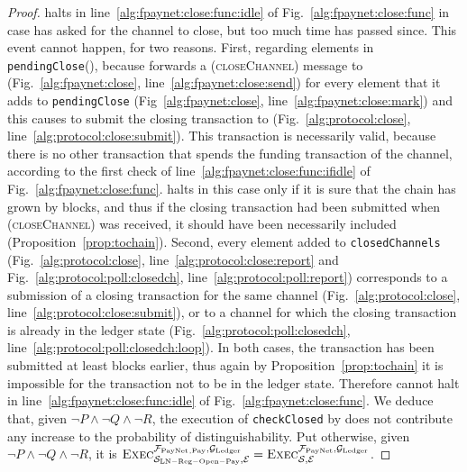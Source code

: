 \begin{proof}
  \fpaynet{} halts in line~\ref{alg:fpaynet:close:func:idle} of
  Fig.~\ref{alg:fpaynet:close:func} in case \environment{} has asked for the
  channel to close, but too much time has passed since. This event cannot
  happen, for two reasons. First, regarding elements in
  \texttt{pendingClose}(\alice), because \fpaynet{} forwards a
  (\textsc{closeChannel}) message to \simulator{} (Fig.~\ref{alg:fpaynet:close},
  line~\ref{alg:fpaynet:close:send}) for every element that it adds to
  \texttt{pendingClose} (Fig~\ref{alg:fpaynet:close},
  line~\ref{alg:fpaynet:close:mark}) and this causes \simulator{} to submit the
  closing transaction to \ledger{} (Fig.~\ref{alg:protocol:close},
  line~\ref{alg:protocol:close:submit}). This transaction is necessarily valid,
  because there is no other transaction that spends the funding transaction of
  the channel, according to the first check of
  line~\ref{alg:fpaynet:close:func:ifidle} of Fig.~\ref{alg:fpaynet:close:func}.
  \fpaynet{} halts in this case only if it is sure that the chain has grown by
  \tochain{} blocks, and thus if the closing transaction had been submitted when
  (\textsc{closeChannel}) was received, it should have been necessarily included
  (Proposition~\ref{prop:tochain}). Second, every element added to
  \texttt{closedChannels} (Fig.~\ref{alg:protocol:close},
  line~\ref{alg:protocol:close:report} and
  Fig.~\ref{alg:protocol:poll:closedch}, line~\ref{alg:protocol:poll:report})
  corresponds to a submission of a closing transaction for the same channel
  (Fig.~\ref{alg:protocol:close}, line~\ref{alg:protocol:close:submit}), or to a
  channel for which the closing transaction is already in the ledger state
  (Fig.~\ref{alg:protocol:poll:closedch},
  line~\ref{alg:protocol:poll:closedch:loop}). In both cases, the transaction
  has been submitted at least \tochain{} blocks earlier, thus again by
  Proposition~\ref{prop:tochain} it is impossible for the transaction not to be
  in the ledger state. Therefore \fpaynet{} cannot halt in
  line~\ref{alg:fpaynet:close:func:idle} of Fig.~\ref{alg:fpaynet:close:func}.
  We deduce that, given $\neg P \wedge \neg Q \wedge \neg R$, the execution of
  \texttt{checkClosed} by \fpaynet{} does not contribute any increase to the
  probability of distinguishability. Put otherwise, given $\neg P \wedge \neg Q
  \wedge \neg R$, it is $\textsc{Exec}^{\mathcal{F}_{\mathrm{PayNet}}{}_{\mathrm{, Pay}},
  \mathcal{G}_{\mathrm{Ledger}}}_{\mathcal{S}_{\mathrm{LN - Reg - Open - Pay}}, \mathcal{E}} =
  \textsc{Exec}^{\mathcal{F}_{\mathrm{PayNet}}, \mathcal{G}_{\mathrm{Ledger}}}_{\mathcal{S}, \mathcal{E}}$.


\end{proof}
